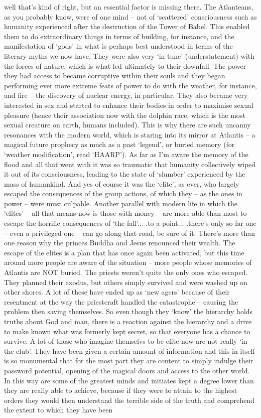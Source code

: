 \begin{footnotesize}
\begin{sffamily}
well that's kind of right, but an essential factor is missing there. The Atlanteans, as you probably know, were of one mind -- not of `scattered' consciousness such as humanity experienced after the destruction of the Tower of Babel. This enabled them to do extraordinary things in terms of building, for instance, and the manifestation of `gods' in what is perhaps best understood in terms of the literary myths we now have. They were also very `in tune' (understatement) with the forces of nature, which is what led ultimately to their downfall. The power they had access to became corruptive within their souls and they began performing ever more extreme feats of power to do with the weather, for instance, and fire -- the discovery of nuclear energy, in particular. They also became very interested in sex and started to enhance their bodies in order to maximise sexual pleasure (hence their association now with the dolphin race, which is the most sexual creature on earth, humans included). This is why there are such uncanny resonances with the modern world, which is staring into its mirror at Atlantis -- a magical future prophecy as much as a past `legend', or buried memory (for `weather modification', read `HAARP'). As far as I'm aware the memory of the flood and all that went with it was so traumatic that humanity collectively wiped it out of its consciousness, leading to the state of `slumber' experienced by the mass of humankind. And yes of course it was the `elite', as ever, who largely escaped the consequences of the group actions, of which they -- as the ones in power -- were must culpable. Another parallel with modern life in which the `elites' -- all that means now is those with money -- are more able than most to escape the horrific consequences of `the fall'... .to a point... .there's only so far one -- even a privileged one -- can go along that road, be sure of it. There's more than one reason why the princes Buddha and Jesus renounced their wealth. The escape of the elites is a plan that has once again been activated, but this time around more people are aware of the situation -- more people whose memories of Atlantis are NOT buried. The priests weren't quite the only ones who escaped. They planned their exodus, but others simply survived and were washed up on other shores. A lot of these have ended up as `new agers' because of their resentment at the way the priestcraft handled the catastrophe -- causing the problem then saving themselves. So even though they `know' the hierarchy holds truths about God and man, there is a reaction against the hierarchy and a drive to make known what was formerly kept secret, so that everyone has a chance to survive. A lot of those who imagine themselvs to be elite now are not really `in the club'. They have been given a certain amount of information and this in itself is so monumental that for the most part they are content to simply indulge their password potential, opening of the magical doors and access to the other world. In this way are some of the greatest minds and initiates kept a degree lower than they are really able to achieve, because if they were to attain to the highest orders they would then understand the terrible side of the truth and comprehend the extent to which they have been 
\end{sffamily}
\end{footnotesize}

